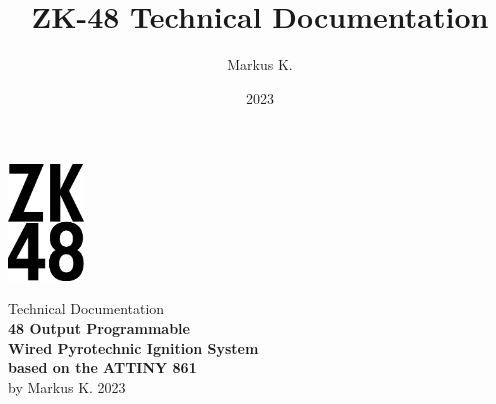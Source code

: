 

\title{ZK-48 Technical Documentation}
\author{Markus K.}
\date{2023}



\begin{titlepage}
\begin{center}
\vspace*{1cm}
\includegraphics[width=2cm]{./Figures/zk_48_logo.png}
\vspace*{1cm}

\Huge {Technical Documentation\\} 
\vspace*{1cm}
\Huge{\textbf{48 Output Programmable\\ Wired Pyrotechnic Ignition System\\ based on the ATTINY 861\\}}
\vspace*{0.5cm} 
\Large{by Markus K.}
\vspace*{0.5cm}
\Large{2023}

\end{center}
\end{titlepage}

\pagebreak 

\tableofcontents

\pagebreak







